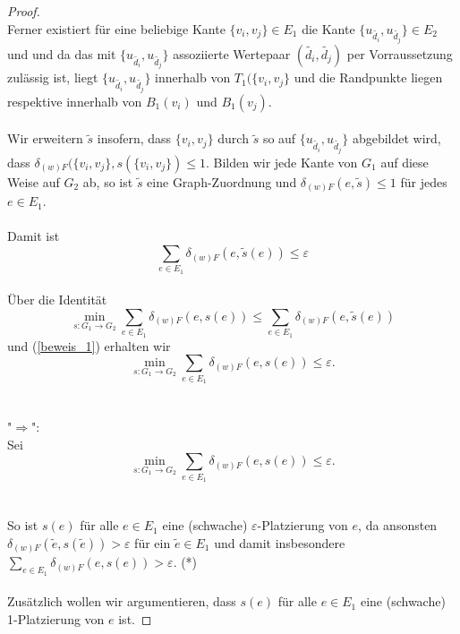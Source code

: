\documentclass[a4paper, 12pt, twoside]{article}
\theoremstyle{Format1} %
\begin{document}
\begin{proof}
\\
Ferner existiert für eine beliebige Kante $\{v_i, v_j\} \in E_1$ die Kante $\{u_{\tilde{d_i}}, u_{\tilde{d_j}}\} \in E_2$ und
und da das mit $\{u_{\tilde{d_i}}, u_{\tilde{d_j}}\}$ assoziierte Wertepaar $(\tilde{d_i},\tilde{d_j})$ per Vorraussetzung zulässig ist,
liegt $\{u_{\tilde{d_i}}, u_{\tilde{d_j}}\}$ innerhalb von $T_1(\{v_i, v_j\}$ und die Randpunkte liegen respektive innerhalb von $B_1(v_i)$ und $B_1(v_j)$.
\\
\\
Wir erweitern $\tilde{s}$ insofern, dass $\{v_i, v_j\}$ durch $\tilde{s}$ so auf $\{u_{\tilde{d_i}}, u_{\tilde{d_j}}\}$ abgebildet wird,
dass $\delta_{(w)F}(\{v_i, v_j\}, s(\{v_i, v_j\}) \leq 1$. Bilden wir jede Kante von $G_1$ auf diese Weise auf $G_2$ ab, so ist $\tilde{s}$ eine Graph-Zuordnung
und $\delta_{(w)F}(e, \tilde{s}) \leq 1$ für jedes $e \in E_1$.
\\
\\
Damit ist
\begin{equation} \label{beweis_1}
	\sum_{e \in E_1} \delta_{(w)F}(e, \tilde{s}(e)) \leq \varepsilon
\end{equation}
\\
Über die Identität $$\min_{s: G_1 \to G_2} \sum_{e \in E_1} \delta_{(w)F}(e, s(e)) \leq \sum_{e \in E_1} \delta_{(w)F}(e,\tilde{s}(e)) $$
und (\ref{beweis_1}) erhalten wir
$$\min_{s: G_1 \to G_2} \sum_{e \in E_1} \delta_{(w)F}(e, s(e)) \leq \varepsilon .$$
\\
\\
"$\Rightarrow$":
\\
Sei $$\min_{s: G_1 \to G_2} \sum_{e \in E_1} \delta_{(w)F}(e, s(e)) \leq {\varepsilon}.$$
\\
\\
So ist $s(e)$ für alle $e \in E_1$ eine (schwache) $\varepsilon$-Platzierung von $e$,
da ansonsten $\delta_{(w)F}(\tilde{e}, s(\tilde{e})) > \varepsilon$ für ein $\tilde{e} \in E_1$ und damit insbesondere $\sum_{{e}\in E_1} \delta_{(w)F}(e, s(e)) > \varepsilon$.
(*)
\\
\\
Zusätzlich wollen wir argumentieren, dass $s(e)$ für alle $e \in E_1$ eine (schwache) 1-Platzierung von $e$ ist.


\end{proof}
\end{document}
